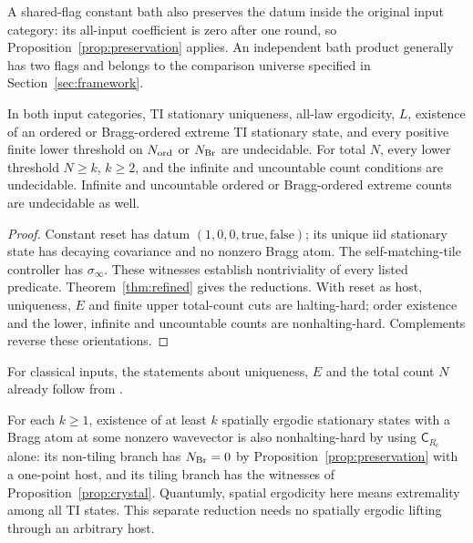 A shared-flag constant bath also preserves the datum inside the original input category: its all-input coefficient is zero after one round, so Proposition~\ref{prop:preservation} applies. An independent bath product generally has two flags and belongs to the comparison universe specified in Section~\ref{sec:framework}.

\begin{corollary}\label{cor:anchors}
In both input categories, TI stationary uniqueness, all-law ergodicity, $L$, existence of an ordered or Bragg-ordered extreme TI stationary state, and every positive finite lower threshold on $N_{\mathrm{ord}}$ or $N_{\mathrm{Br}}$ are undecidable. For total $N$, every lower threshold $N\ge k$, $k\ge2$, and the infinite and uncountable count conditions are undecidable. Infinite and uncountable ordered or Bragg-ordered extreme counts are undecidable as well.
\end{corollary}
\begin{proof}
Constant reset has datum $(1,0,0,\mathrm{true},\mathrm{false})$; its unique iid stationary state has decaying covariance and no nonzero Bragg atom. The self-matching-tile controller has $\sigma_\infty$. These witnesses establish nontriviality of every listed predicate. Theorem~\ref{thm:refined} gives the reductions. With reset as host, uniqueness, $E$ and finite upper total-count cuts are halting-hard; order existence and the lower, infinite and uncountable counts are nonhalting-hard. Complements reverse these orientations.
\end{proof}

For classical inputs, the statements about uniqueness, $E$ and the total count $N$ already follow from \cite[Corollary~3.11]{DMforget}.

For each $k\ge1$, existence of at least $k$ spatially ergodic stationary states with a Bragg atom at some nonzero wavevector is also nonhalting-hard by using $\mathsf C_{R_e}$ alone: its non-tiling branch has $N_{\mathrm{Br}}=0$ by Proposition~\ref{prop:preservation} with a one-point host, and its tiling branch has the witnesses of Proposition~\ref{prop:crystal}. Quantumly, spatial ergodicity here means extremality among all TI states. This separate reduction needs no spatially ergodic lifting through an arbitrary host.

